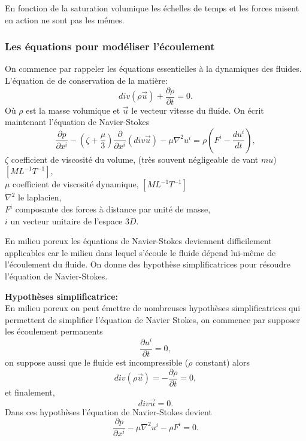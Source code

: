 \documentclass[a4paper,10pt]{article}
\begin{document}
	En fonction de la saturation volumique les échelles de temps et les forces misent en action ne sont pas les mêmes.
	
	
	\subsubsection{Les équations pour modéliser l'écoulement}
	\label{darcy}
	On commence par rappeler les équations essentielles à la dynamiques des fluides. 
	L'équation de de conservation de la matière:
	\begin{equation}
		\label{cons-mat}
		div(\rho \overrightarrow{u})+\frac{\partial \rho}{\partial t}=0.
	\end{equation}
	Où $\rho$ est la masse volumique et $\overrightarrow{u}$ le vecteur vitesse du fluide. On écrit maintenant l'équation de Navier-Stokes
	\begin{equation}
		\frac{\partial p}{\partial x^i}-(\zeta+\frac{\mu}{3})\frac{\partial}{\partial x^i}(div\overrightarrow{u}) - \mu \nabla^2u^i=\rho(F^i -\frac{du^i}{dt}),
	\end{equation}
	$\zeta$ coefficient de viscosité du volume, (très souvent négligeable de vant $mu$) $[ML^{-1}T^{-1}]$,\\
	$\mu$ coefficient de viscosité dynamique, $[ML^{-1}T^{-1}]$\\
	$\nabla^2$ le laplacien,\\
	$F^i$ composante des forces à distance par unité de masse,\\
	$i$ un vecteur unitaire de l'espace $3D$.
	
	En milieu poreux les équations de Navier-Stokes deviennent difficilement applicables car le milieu dans lequel s'écoule le fluide dépend lui-même de l'écoulement du fluide. On donne des hypothèse simplificatrices pour résoudre l'équation de Navier-Stokes. 
	
	\noindent \textbf{Hypothèses simplificatrice:}\\
	En milieu poreux on peut émettre de nombreuses hypothèses simplificatrices qui permettent de simplifier l'équation de Navier Stokes, on commence par supposer les écoulement permanents
	\[\frac{\partial u^i}{\partial t}=0,\]
	on suppose aussi que le fluide est incompressible ($\rho$ constant) alors
	\[div(\rho \overrightarrow{u})=-\frac{\partial \rho}{\partial t}=0,\]
	et finalement,
	\[div \overrightarrow{u}=0.\]
	Dans ces hypothèses l'équation de Navier-Stokes devient
	\begin{equation}
		\frac{\partial p}{\partial x^i}-\mu \nabla^2u^i-\rho F^i=0. 
	\end{equation}
	
\end{document}
